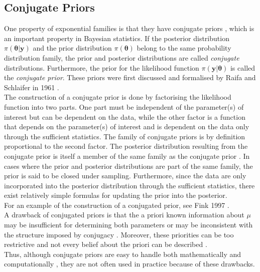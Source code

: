 \subsection{Conjugate Priors}
One property of exponential families is that they have conjugate priors \autocite[][]{diaconis1979conjugate}, which is an important property in Bayesian statistics. If the posterior distribution $\pi\left(\pmb{\theta}|\pmb{y}\right)$ and the prior distribution $\pi\left(\pmb{\theta}\right)$ belong to the same probability distribution family, the prior and posterior distributions are called \textit{conjugate} distributions. Furthermore, the prior for the likelihood function $\pi\left(\pmb{y}|\pmb{\theta}\right)$ is called the \textit{conjugate prior}. These priors were first discussed and formalised by Raifa and Schlaifer in 1961 \autocite[][]{raiffaapplied}. \\
The construction of a conjugate prior is done by factorising the likelihood function into two parts. One part must be independent of the parameter(s) of interest but can be dependent on the data, while the other factor is a function that depends on the parameter(s) of interest and is dependent on the data only through the sufficient statistics. The family of conjugate priors is by definition proportional to the second factor. The posterior distribution resulting from the conjugate prior is itself a member of the same family as the conjugate prior \autocite[][]{raiffaapplied}. In cases where the prior and posterior distributions are part of the same family, the prior is said to be closed under sampling. Furthermore, since the data are only incorporated into the posterior distribution through the sufficient statistics, there exist relatively simple formulas for updating the prior into the posterior.\\
For an example of the construction of a conjugated prior, see Fink 1997 \autocite[][]{fink1997compendium}.\\
A drawback of conjugated priors is that the a priori known information about $\mu$ may be insufficient for determining both parameters or may be inconsistent with the structure imposed by conjugacy \autocite[][]{robert2010bayesian}. Moreover, these priorities can be too restrictive and not every belief about the priori can be described \autocite[][]{irwin2005prior}. \\
Thus, although conjugate priors are easy to handle both mathematically and computationally \autocite[][]{irwin2005prior}, they are not often used in practice because of these drawbacks.
